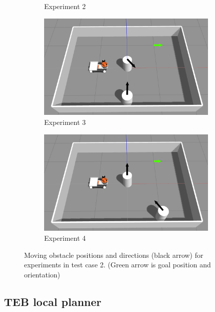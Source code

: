 \begin{figure}[H]
\begin{subfigure}[b]{0.50\linewidth}
        \caption{Experiment 2}
    \end{subfigure}
    \begin{subfigure}[b]{0.50\linewidth}
        \centering
        \includegraphics[width=0.95\textwidth]{images/test_case_2/exp3.png}
        \caption{Experiment 3}
    \end{subfigure}%
    \begin{subfigure}[b]{0.50\linewidth}
        \centering
        \includegraphics[width=0.95\textwidth]{images/test_case_2/exp4.png}
        \caption{Experiment 4}
    \end{subfigure}%
    \caption{Moving obstacle positions and directions (black arrow) for experiments in test case 2.
    (Green arrow is goal position and orientation)}\label{fig:test_case_2_experiment_start}
\end{figure}

\subsection{TEB local planner}%
\label{sub:eval_teb_local_planner_tc2}

